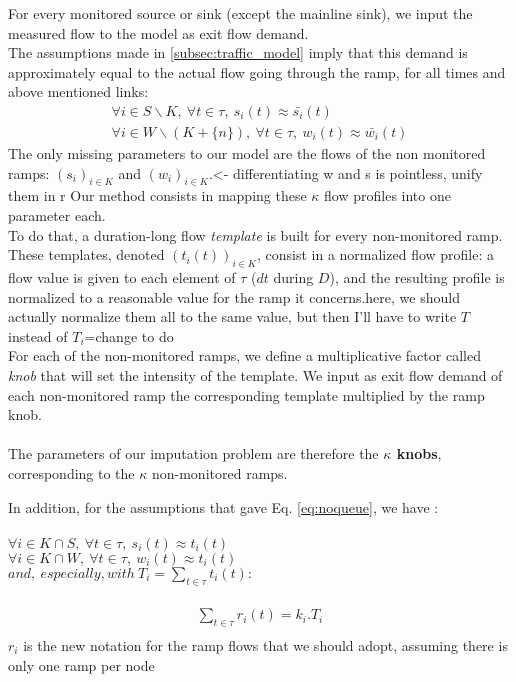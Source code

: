For every monitored source or sink (except the mainline sink), we input the measured flow to the model as exit flow demand.\\ The assumptions made in \ref{subsec:traffic_model} imply that this demand is approximately equal to the actual flow going through the ramp, for all times and above mentioned links:\\
\begin{align}
	\label{eq:noqueue}
	\forall i\in S\backslash K,\ \forall t\in \tau,\ s_{i}(t)\approx\bar{s_{i}}(t)\\
	\forall i\in W\backslash(K+\{n\}),\ \forall t\in \tau,\ w_{i}(t)\approx\bar{w_{i}}(t)
\end{align}
The only missing parameters to our model are the flows of the non monitored ramps: $(s_{i})_{i\in K}$ and $(w_{i})_{i\in K}$.\color{red}<- differentiating w and s is pointless, unify them in r\color{black}
Our method consists in mapping these $\kappa$ flow profiles into one parameter each.\\
To do that, a duration-long flow \emph{template} is built for every non-monitored ramp. These templates, denoted $(t_{i}(t))_{i\in{K}}$, consist in a normalized flow profile: a flow value is given to each element of $\tau$ ($dt$ during $D$), and the resulting profile is normalized to a reasonable value for the ramp it concerns.\color{red}here, we should actually normalize them all to the same value, but then I'll have to write $T$ instead of $T_{i}$=change to do\color{black}\\
For each of the non-monitored ramps, we define a multiplicative factor called \emph{knob} that will set the intensity of the template. 
We input as exit flow demand of each non-monitored ramp the corresponding template multiplied by the ramp knob.\\
\\
The parameters of our imputation problem are therefore the \textbf{$\kappa$ knobs}, corresponding to the $\kappa$ non-monitored ramps.

In addition, for the assumptions that gave Eq. \ref{eq:noqueue}, we have :\\
\\
$\forall i \in K\cap S,\ \forall t\in \tau,\ s_{i}(t)\approx t_{i}(t)$\\
$\forall i \in K\cap W,\ \forall t\in \tau,\ w_{i}(t)\approx t_{i}(t)$\\
$and,\ especially, with\ T_{i}=\sum\limits_{t\in\tau}t_{i}(t):$\\
\\
\begin{align}
	\label{eq:noqueuetemplate}
	\sum\limits_{t \in \tau} r_{i}(t)=k_{i}.T_{i}\\
\end{align}\color{red}$r_{i}$ is the new notation for the ramp flows that we should adopt, assuming there is only one ramp per node\color{black}